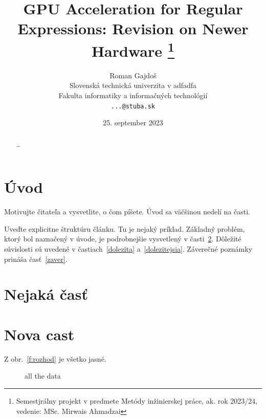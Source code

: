 \documentclass[10pt,onecolumn,twoside,slovak,a4paper]{article}
\title{GPU Acceleration for Regular Expressions: Revision on Newer Hardware
\thanks{Semestjrálny projekt v predmete Metódy inžinierskej práce, ak. rok 2023/24, vedenie: MSc. Mirwais Ahmadzai}} %
\author{Roman Gajdoš\\[2pt]
	{\small Slovenská technická univerzita v adfadfa}\\
	{\small Fakulta informatiky a informačných technológií}\\
	{\small \texttt{...@stuba.sk}}
	}
\date{\small 25. september 2023} %
\begin{document}
\maketitle

\begin{abstract}
	\ldots
\end{abstract}



\section{Úvod}

Motivujte čitateľa a vysvetlite, o čom píšete. Úvod sa väčšinou nedelí na časti.

Uveďte explicitne štruktúru článku. Tu je nejaký príklad.
Základný problém, ktorý bol naznačený v úvode, je podrobnejšie vysvetlený v časti~\ref{nejaka}.
Dôležité súvislosti sú uvedené v častiach~\ref{dolezita} a~\ref{dolezitejsia}.
Záverečné poznámky prináša časť~\ref{zaver}.



\section{Nejaká časť} \label{nejaka}
\section{Nova cast} \label{nejaky label}
Z obr.~\ref{f:rozhod} je všetko jasné.



\begin{figure}[htp]
	\centering
	\hfill%
	\caption{all the data}
\end{figure}
\end{document}
